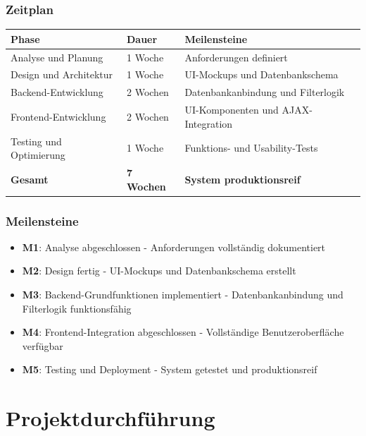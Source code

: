 \documentclass[11pt,a4paper]{article}
\begin{document}
\subsubsection{Zeitplan}
\begin{center}
\begin{tabular}{|l|l|l|}
\hline
\textbf{Phase} & \textbf{Dauer} & \textbf{Meilensteine} \\
\hline
Analyse und Planung & 1 Woche & Anforderungen definiert \\
\hline
Design und Architektur & 1 Woche & UI-Mockups und Datenbankschema \\
\hline
Backend-Entwicklung & 2 Wochen & Datenbankanbindung und Filterlogik \\
\hline
Frontend-Entwicklung & 2 Wochen & UI-Komponenten und AJAX-Integration \\
\hline
Testing und Optimierung & 1 Woche & Funktions- und Usability-Tests \\
\hline
\textbf{Gesamt} & \textbf{7 Wochen} & \textbf{System produktionsreif} \\
\hline
\end{tabular}
\end{center}

\subsubsection{Meilensteine}
\begin{itemize}
    \item \textbf{M1}: Analyse abgeschlossen - Anforderungen vollständig dokumentiert
    \item \textbf{M2}: Design fertig - UI-Mockups und Datenbankschema erstellt
    \item \textbf{M3}: Backend-Grundfunktionen implementiert - Datenbankanbindung und Filterlogik funktionsfähig
    \item \textbf{M4}: Frontend-Integration abgeschlossen - Vollständige Benutzeroberfläche verfügbar
    \item \textbf{M5}: Testing und Deployment - System getestet und produktionsreif
\end{itemize}

\newpage
\section{Projektdurchführung}
\end{document}
